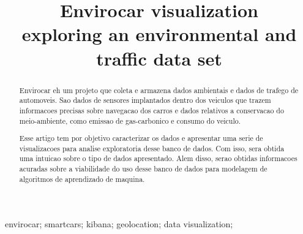 \documentclass[10pt, conference]{IEEEtran}
\begin{document}
%
\title{Envirocar visualization \\ exploring an environmental and traffic data set}

\newif\iffinal
\finaltrue
\newcommand{\jemsid}{99999}


\iffinal
  \author{%
  }
\else
  \author{Sibgrapi paper ID: \jemsid \\ }
\fi


\maketitle


\begin{abstract}
Envirocar eh um projeto que coleta e armazena dados ambientais e dados de trafego
de automoveis. 
Sao dados de sensores implantados dentro dos veiculos que trazem informacoes
precisas sobre navegacao dos carros e dados relativos a conservacao do meio-ambiente, 
como emissao de gas-carbonico e consumo do veiculo. 

Esse artigo tem por objetivo caracterizar os dados e apresentar uma serie de 
visualizacoes para analise exploratoria desse banco de dados. Com isso, sera
obtida uma intuicao sobre o tipo de dados apresentado. Alem disso, serao obtidas
informacoes acuradas sobre a viabilidade do uso desse banco de dados para modelagem
de algoritmos de aprendizado de maquina.

%
\end{abstract}

\begin{IEEEkeywords}
envirocar; smartcars; kibana; geolocation; data visualization;

\end{IEEEkeywords}
\end{document}
